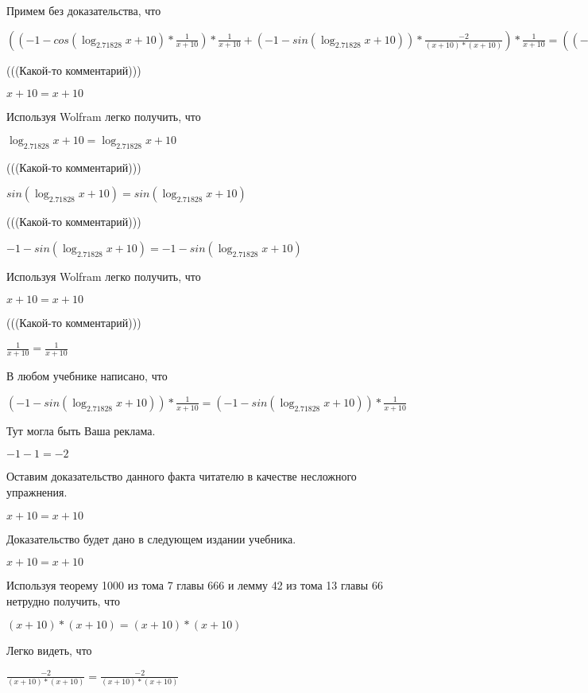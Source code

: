 \documentclass[12pt,a4paper,fleqn]{article}
\theoremstyle{definition}
\begin{document}
Примем без доказательства, что 

$(( -1  - cos(\log_{ 2.71828 }{ x  +  10 }) * \frac{ 1 }{ x  +  10 }
) * \frac{ 1 }{ x  +  10 }
 + ( -1  - sin(\log_{ 2.71828 }{ x  +  10 })) * \frac{ -2 }{( x  +  10 ) * ( x  +  10 )}
) * \frac{ 1 }{ x  +  10 }
 = (( -1  - cos(\log_{ 2.71828 }{ x  +  10 }) * \frac{ 1 }{ x  +  10 }
) * \frac{ 1 }{ x  +  10 }
 + ( -1  - sin(\log_{ 2.71828 }{ x  +  10 })) * \frac{ -2 }{( x  +  10 ) * ( x  +  10 )}
) * \frac{ 1 }{ x  +  10 }
$

(((Какой-то комментарий))) 

$ x  +  10  =  x  +  10 $

Используя Wolfram легко получить, что 

$\log_{ 2.71828 }{ x  +  10 } = \log_{ 2.71828 }{ x  +  10 }$

(((Какой-то комментарий))) 

$sin(\log_{ 2.71828 }{ x  +  10 }) = sin(\log_{ 2.71828 }{ x  +  10 })$

(((Какой-то комментарий))) 

$ -1  - sin(\log_{ 2.71828 }{ x  +  10 }) =  -1  - sin(\log_{ 2.71828 }{ x  +  10 })$

Используя Wolfram легко получить, что 

$ x  +  10  =  x  +  10 $

(((Какой-то комментарий))) 

$\frac{ 1 }{ x  +  10 }
 = \frac{ 1 }{ x  +  10 }
$

В любом учебнике написано, что 

$( -1  - sin(\log_{ 2.71828 }{ x  +  10 })) * \frac{ 1 }{ x  +  10 }
 = ( -1  - sin(\log_{ 2.71828 }{ x  +  10 })) * \frac{ 1 }{ x  +  10 }
$

Тут могла быть Ваша реклама. 

$ -1  -  1  =  -2 $

Оставим доказательство данного факта читателю в качестве несложного упражнения. 

$ x  +  10  =  x  +  10 $

Доказательство будет дано в следующем издании учебника. 

$ x  +  10  =  x  +  10 $

Используя теорему 1000 из тома 7 главы 666 и лемму 42 из тома 13 главы 66 нетрудно получить, что 

$( x  +  10 ) * ( x  +  10 ) = ( x  +  10 ) * ( x  +  10 )$

Легко видеть, что 

$\frac{ -2 }{( x  +  10 ) * ( x  +  10 )}
 = \frac{ -2 }{( x  +  10 ) * ( x  +  10 )}
$
\end{document}
